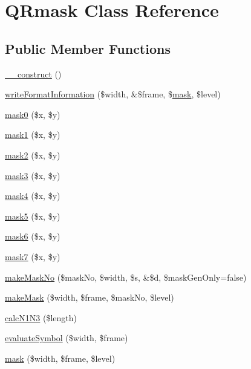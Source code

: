 \hypertarget{class_q_rmask}{\section{Q\-Rmask Class Reference}
\label{class_q_rmask}
}
\subsection*{Public Member Functions}
\begin{DoxyCompactItemize}
\item 
\hyperlink{class_q_rmask_a095c5d389db211932136b53f25f39685}{\-\_\-\-\_\-construct} ()
\item 
\hyperlink{class_q_rmask_aebc06444f3a4e501e36e36f4563b7da7}{write\-Format\-Information} (\$width, \&\$frame, \$\hyperlink{class_q_rmask_ad72ccbc57cd464d0ae7f59304b55a820}{mask}, \$level)
\item 
\hyperlink{class_q_rmask_a415e82f2512a5d08f7b8412041154c4f}{mask0} (\$x, \$y)
\item 
\hyperlink{class_q_rmask_ac94765f40cadf0c45c170569e74d0d45}{mask1} (\$x, \$y)
\item 
\hyperlink{class_q_rmask_a0b73f61b91c742501607c6f5faf528e8}{mask2} (\$x, \$y)
\item 
\hyperlink{class_q_rmask_a37024dd01fba620f4aed443dc1ac0a10}{mask3} (\$x, \$y)
\item 
\hyperlink{class_q_rmask_a93185c13253a0e3a0c74dabe3a7d0efb}{mask4} (\$x, \$y)
\item 
\hyperlink{class_q_rmask_a2ee233b5cc2b87f13b9b70f2b1d5a95b}{mask5} (\$x, \$y)
\item 
\hyperlink{class_q_rmask_ad990b0b866cc0200ea94c676a16a1735}{mask6} (\$x, \$y)
\item 
\hyperlink{class_q_rmask_a0bdbe8b44beccab196ea84182b8d8bc5}{mask7} (\$x, \$y)
\item 
\hyperlink{class_q_rmask_a9fc6ed41d5e1cf386bb68854dc751461}{make\-Mask\-No} (\$mask\-No, \$width, \$s, \&\$d, \$mask\-Gen\-Only=false)
\item 
\hyperlink{class_q_rmask_a15527322477fe46063a640d6a16e8c3f}{make\-Mask} (\$width, \$frame, \$mask\-No, \$level)
\item 
\hyperlink{class_q_rmask_a69d7decec19c70af6e8ac832b28b2584}{calc\-N1\-N3} (\$length)
\item 
\hyperlink{class_q_rmask_a8e178cdbccc1c0d4d1bab4faf9697ff5}{evaluate\-Symbol} (\$width, \$frame)
\item 
\hyperlink{class_q_rmask_ad72ccbc57cd464d0ae7f59304b55a820}{mask} (\$width, \$frame, \$level)
\end{DoxyCompactItemize}
